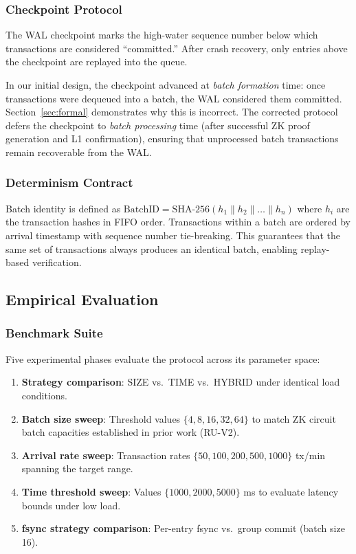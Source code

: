 \subsubsection{Checkpoint Protocol}

The WAL checkpoint marks the high-water sequence number below which transactions
are considered ``committed.'' After crash recovery, only entries above the
checkpoint are replayed into the queue.

In our initial design, the checkpoint advanced at \emph{batch formation} time:
once transactions were dequeued into a batch, the WAL considered them committed.
Section~\ref{sec:formal} demonstrates why this is incorrect. The corrected
protocol defers the checkpoint to \emph{batch processing} time (after successful
ZK proof generation and L1 confirmation), ensuring that unprocessed batch
transactions remain recoverable from the WAL.

\subsubsection{Determinism Contract}

Batch identity is defined as $\text{BatchID} = \text{SHA-256}(h_1 \| h_2 \| \ldots \| h_n)$
where $h_i$ are the transaction hashes in FIFO order. Transactions within a
batch are ordered by arrival timestamp with sequence number tie-breaking.
This guarantees that the same set of transactions always produces an identical
batch, enabling replay-based verification.

\subsection{Empirical Evaluation}

\subsubsection{Benchmark Suite}

Five experimental phases evaluate the protocol across its parameter space:

\begin{enumerate}
\item \textbf{Strategy comparison}: SIZE vs.\ TIME vs.\ HYBRID under identical
  load conditions.
\item \textbf{Batch size sweep}: Threshold values $\{4, 8, 16, 32, 64\}$ to
  match ZK circuit batch capacities established in prior work (RU-V2).
\item \textbf{Arrival rate sweep}: Transaction rates $\{50, 100, 200, 500, 1000\}$
  tx/min spanning the target range.
\item \textbf{Time threshold sweep}: Values $\{1000, 2000, 5000\}$ ms to evaluate
  latency bounds under low load.
\item \textbf{fsync strategy comparison}: Per-entry fsync vs.\ group commit
  (batch size 16).
\end{enumerate}

